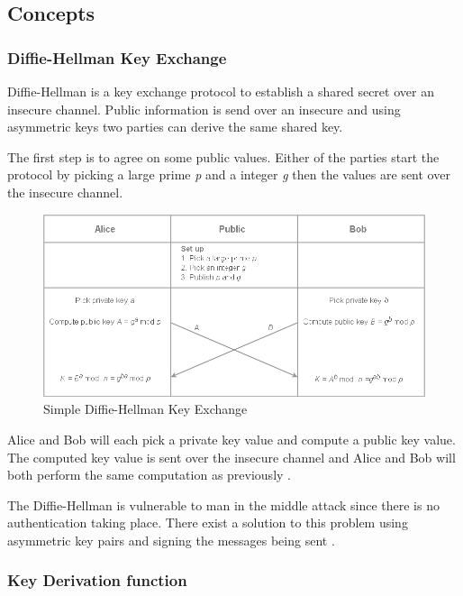 \subsection{Concepts}



\subsubsection{Diffie-Hellman Key Exchange}

Diffie-Hellman is a key exchange protocol to establish a shared secret over an insecure channel. Public information is send over an insecure and using asymmetric keys two parties can derive the same shared key.


The first step is to agree on some public values. Either of the parties start the protocol by picking a large prime \emph{p} and a integer \emph{g} then the values are sent over the insecure channel.  

\begin{figure}[H]
	\hspace*{-1cm} 
	\centering
	\includegraphics[width=14cm]{figures/dh.png}
	\caption{Simple Diffie-Hellman Key Exchange}
	\label{fig:dh}
\end{figure}

Alice and Bob will each pick a private key value and compute a public key value. The computed key value is sent over the insecure channel and Alice and Bob will both perform the same computation as previously \cite{crypto101}.


The Diffie-Hellman is vulnerable to man in the middle attack since there is no authentication taking place. There exist a solution to this problem using asymmetric key pairs and signing the messages being sent \cite{crypto101}.

\subsubsection{Key Derivation function}

